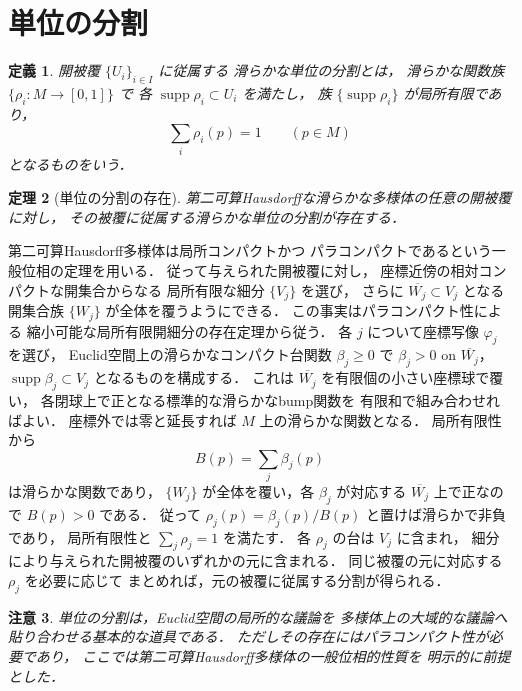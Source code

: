 \documentclass[a5paper,10pt,onecolumn]{jsarticle}
\makeatletter
\theoremstyle{mathnotetheorem}
\newtheorem{theorem}{定理}[section]
\newtheorem{definition}[theorem]{定義}
\newtheorem{remark}[theorem]{注意}
\renewcommand{\proofname}{証明}
\renewenvironment{proof}[1][\proofname]{%
  \par\pushQED{\qed}\normalfont\topsep4\p@\@plus2\p@\relax
  \trivlist\item[\hskip\labelsep\bfseries #1]\ignorespaces
}{\popQED\endtrivlist\@endpefalse}
\makeatother
\begin{document}
\section{単位の分割}

\begin{definition}
開被覆 $\{U_i\}_{i\in I}$ に従属する
\emph{滑らかな単位の分割}とは，
滑らかな関数族 $\{\rho_i:M\to[0,1]\}$ で
各 $\operatorname{supp}\rho_i\subset U_i$ を満たし，
族 $\{\operatorname{supp}\rho_i\}$ が局所有限であり，
\[
 \sum_i\rho_i(p)=1\qquad(p\in M)
\]
となるものをいう．
\end{definition}

\begin{theorem}[単位の分割の存在]\label{thm:partition}
第二可算Hausdorffな滑らかな多様体の任意の開被覆に対し，
その被覆に従属する滑らかな単位の分割が存在する．
\end{theorem}
\begin{proof}
第二可算Hausdorff多様体は局所コンパクトかつ
パラコンパクトであるという一般位相の定理を用いる．
従って与えられた開被覆に対し，
座標近傍の相対コンパクトな開集合からなる
局所有限な細分 $\{V_j\}$ を選び，
さらに
$\overline{W_j}\subset V_j$ となる開集合族
$\{W_j\}$ が全体を覆うようにできる．
この事実はパラコンパクト性による
縮小可能な局所有限開細分の存在定理から従う．
各 $j$ について座標写像 $\varphi_j$ を選び，
Euclid空間上の滑らかなコンパクト台関数
$\beta_j\ge0$ で
$\beta_j>0$ on $\overline{W_j}$，
$\operatorname{supp}\beta_j\subset V_j$ となるものを構成する．
これは $\overline{W_j}$ を有限個の小さい座標球で覆い，
各閉球上で正となる標準的な滑らかなbump関数を
有限和で組み合わせればよい．
座標外では零と延長すれば $M$ 上の滑らかな関数となる．
局所有限性から
\[
 B(p)=\sum_j\beta_j(p)
\]
は滑らかな関数であり，
$\{W_j\}$ が全体を覆い，各 $\beta_j$ が対応する
$\overline{W_j}$ 上で正なので $B(p)>0$ である．
従って
$\rho_j(p)=\beta_j(p)/B(p)$ と置けば滑らかで非負であり，
局所有限性と $\sum_j\rho_j=1$ を満たす．
各 $\rho_j$ の台は $V_j$ に含まれ，
細分により与えられた開被覆のいずれかの元に含まれる．
同じ被覆の元に対応する $\rho_j$ を必要に応じて
まとめれば，元の被覆に従属する分割が得られる．
\end{proof}

\begin{remark}
単位の分割は，Euclid空間の局所的な議論を
多様体上の大域的な議論へ貼り合わせる基本的な道具である．
ただしその存在にはパラコンパクト性が必要であり，
ここでは第二可算Hausdorff多様体の一般位相的性質を
明示的に前提とした．
\end{remark}
\end{document}
